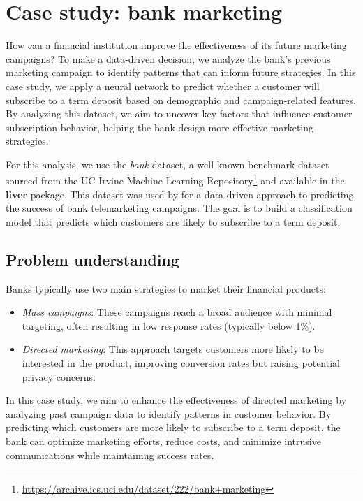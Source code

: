 \documentclass[
  11pt,
]{book}
\providecommand{\tightlist}{%
  \setlength{\itemsep}{0pt}\setlength{\parskip}{0pt}}
\renewcommand{\href}[2]{#2\footnote{\url{#1}}}
\theoremstyle{definition}
\theoremstyle{definition}
\theoremstyle{definition}
\theoremstyle{definition}
\theoremstyle{remark}
\begin{document}
\section{Case study: bank marketing}\label{case-study-bank-marketing}

How can a financial institution improve the effectiveness of its future marketing campaigns? To make a data-driven decision, we analyze the bank's previous marketing campaign to identify patterns that can inform future strategies. In this case study, we apply a neural network to predict whether a customer will subscribe to a term deposit based on demographic and campaign-related features. By analyzing this dataset, we aim to uncover key factors that influence customer subscription behavior, helping the bank design more effective marketing strategies.

For this analysis, we use the \emph{bank} dataset, a well-known benchmark dataset sourced from the \href{https://archive.ics.uci.edu/dataset/222/bank+marketing}{UC Irvine Machine Learning Repository} and available in the \textbf{liver} package. This dataset was used by \citet{moro2014data} for a data-driven approach to predicting the success of bank telemarketing campaigns. The goal is to build a classification model that predicts which customers are likely to subscribe to a term deposit.

\subsection*{Problem understanding}\label{problem-understanding-3}


Banks typically use two main strategies to market their financial products:

\begin{itemize}
\tightlist
\item
  \emph{Mass campaigns}: These campaigns reach a broad audience with minimal targeting, often resulting in low response rates (typically below 1\%).\\
\item
  \emph{Directed marketing}: This approach targets customers more likely to be interested in the product, improving conversion rates but raising potential privacy concerns.
\end{itemize}

In this case study, we aim to enhance the effectiveness of directed marketing by analyzing past campaign data to identify patterns in customer behavior. By predicting which customers are more likely to subscribe to a term deposit, the bank can optimize marketing efforts, reduce costs, and minimize intrusive communications while maintaining success rates.
\end{document}
